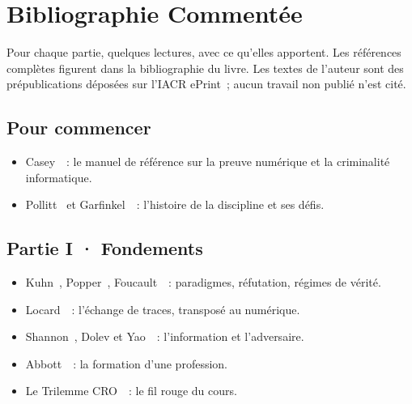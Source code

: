 
\chapter{Bibliographie Commentée}
\label{ann:biblio}

Pour chaque partie, quelques lectures, avec ce qu'elles apportent. Les références
complètes figurent dans la bibliographie du livre. Les textes de l'auteur sont des
prépublications déposées sur l'IACR ePrint~; aucun travail non publié n'est cité.

\section*{Pour commencer}
\begin{itemize}
    \item Casey~\cite{casey2004}~: le manuel de référence sur la preuve numérique et la criminalité informatique.
    \item Pollitt~\cite{pollitt2010history} et Garfinkel~\cite{garfinkel2010next}~: l'histoire de la discipline et ses défis.
\end{itemize}

\section*{Partie I · Fondements}
\begin{itemize}
    \item Kuhn~\cite{kuhn1962}, Popper~\cite{popper1973}, Foucault~\cite{foucault1969}~: paradigmes, réfutation, régimes de vérité.
    \item Locard~\cite{locard1920}~: l'échange de traces, transposé au numérique.
    \item Shannon~\cite{shannon1948}, Dolev et Yao~\cite{dolevyao1983}~: l'information et l'adversaire.
    \item Abbott~\cite{abbott1988}~: la formation d'une profession.
    \item Le Trilemme CRO~\cite{minka2025cro}~: le fil rouge du cours.
\end{itemize}

